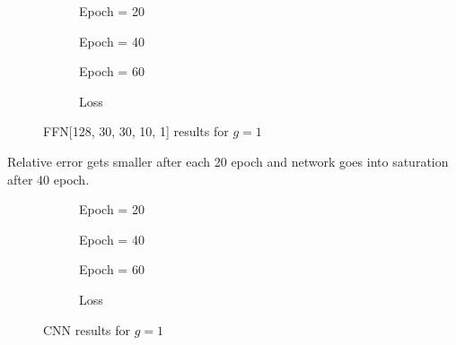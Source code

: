 \documentclass[a4paper,times,12pt]{article}
\begin{document}
\begin{figure}[H]
    \centering
    \begin{subfigure}[t]{0.45\textwidth}
		\centering
        
        \caption{Epoch = 20}
		\label{fig:a}
    \end{subfigure}
    \begin{subfigure}[t]{0.45\textwidth}
		\centering
        
        \caption{Epoch = 40}
		\label{fig:b}
    \end{subfigure}    
    \begin{subfigure}[t]{0.45\textwidth}
        \centering
        
        \caption{Epoch = 60}
		\label{fig:c}
    \end{subfigure}
    \begin{subfigure}[t]{0.45\textwidth}
        \centering
        
        \caption{Loss}
		\label{fig:c}
    \end{subfigure}
	\caption{FFN[128, 30, 30, 10, 1] results for $g = 1$}
\label{fig:FNN-g-1}
\end{figure}

Relative error gets smaller after each 20 epoch and network goes into saturation after 40 epoch.

\begin{figure}[H]
    \centering
    \begin{subfigure}[t]{0.45\textwidth}
		\centering
        
        \caption{Epoch = 20}
		\label{fig:a}
    \end{subfigure}
    \begin{subfigure}[t]{0.45\textwidth}
		\centering
        
        \caption{Epoch = 40}
		\label{fig:b}
    \end{subfigure}    
    \begin{subfigure}[t]{0.45\textwidth}
        \centering
        
        \caption{Epoch = 60}
		\label{fig:c}
    \end{subfigure}
    \begin{subfigure}[t]{0.45\textwidth}
        \centering
        
        \caption{Loss}
		\label{fig:c}
    \end{subfigure}
	\caption{CNN results for $g = 1$}
\label{fig:CNN-g-1}
\end{figure}
\end{document}
